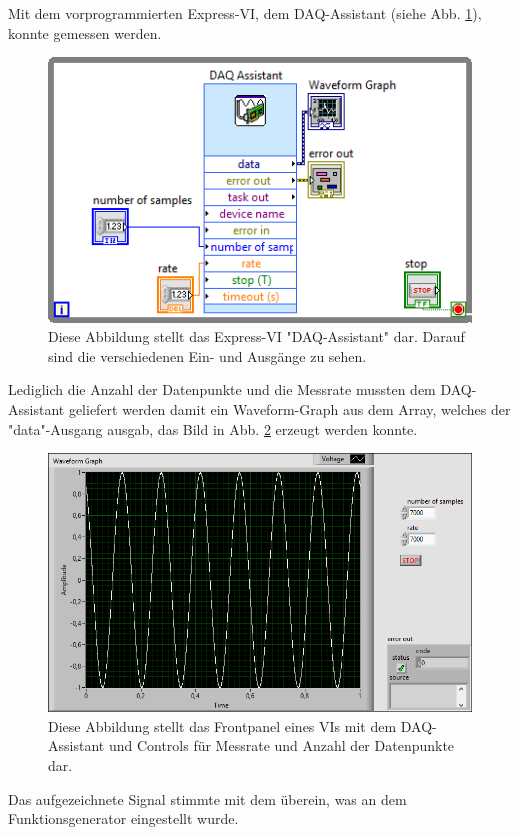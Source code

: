 		Mit dem vorprogrammierten Express-VI, dem DAQ-Assistant (siehe Abb. \ref{fig:daq}), konnte gemessen werden.
		\begin{figure}[ht]
			\centering
			\includegraphics[width=\textwidth]{pic/daq.png}
			\caption{Diese Abbildung stellt das Express-VI "DAQ-Assistant" dar. Darauf sind die verschiedenen Ein- und Ausgänge zu sehen.}
			\label{fig:daq}	
		\end{figure}
		Lediglich die Anzahl der Datenpunkte und die Messrate mussten dem DAQ-Assistant geliefert werden damit ein Waveform-Graph aus dem Array, welches der "data"-Ausgang ausgab, das Bild in Abb. \ref{fig:daq_sig} erzeugt werden konnte. 
		\begin{figure}[ht]
			\centering
			\includegraphics[width=\textwidth]{pic/daq_sig.png}
			\caption{Diese Abbildung stellt das Frontpanel eines VIs mit dem DAQ-Assistant und Controls für Messrate und Anzahl der Datenpunkte dar.}
			\label{fig:daq_sig}	
		\end{figure}
		Das aufgezeichnete Signal stimmte mit dem überein, was an dem Funktionsgenerator eingestellt wurde.
	
